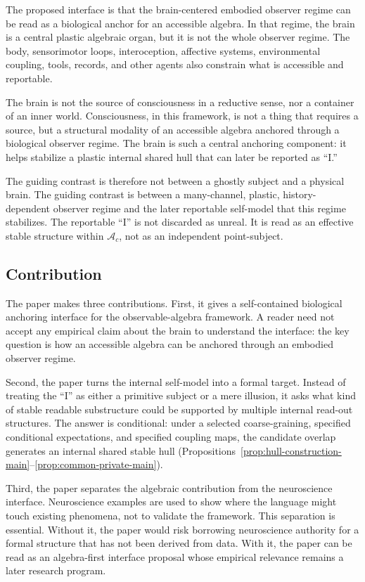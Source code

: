 \documentclass[12pt]{article}
\theoremstyle{definition}
\theoremstyle{remark}
\newcommand{\Ac}{\mathcal A_c}
\begin{document}
The proposed interface is that the brain-centered embodied observer
regime can be read as a biological anchor for an accessible algebra. In
that regime, the brain is a central plastic algebraic organ, but it is
not the whole observer regime. The body, sensorimotor loops,
interoception, affective systems, environmental coupling, tools,
records, and other agents also constrain what is accessible and
reportable.

The brain is not the source of consciousness in a reductive sense, nor
a container of an inner world. Consciousness, in this framework, is not
a thing that requires a source, but a structural modality of an
accessible algebra anchored through a biological observer regime. The
brain is such a central anchoring component: it helps stabilize a
plastic internal shared hull that can later be reported as ``I.''

The guiding contrast is therefore not between a ghostly subject and a
physical brain. The guiding contrast is between a many-channel,
plastic, history-dependent observer regime and the later reportable
self-model that this regime stabilizes. The reportable ``I'' is not
discarded as unreal. It is read as an effective stable structure within
\(\Ac\), not as an independent point-subject.

\subsection*{Contribution}

The paper makes three contributions. First, it gives a self-contained
biological anchoring interface for the observable-algebra framework. A
reader need not accept any empirical claim about the brain to understand
the interface: the key question is how an accessible algebra can be
anchored through an embodied observer regime.

Second, the paper turns the internal self-model into a formal target.
Instead of treating the ``I'' as either a primitive subject or a mere
illusion, it asks what kind of stable readable substructure could be
supported by multiple internal read-out structures. The answer is
conditional: under a selected coarse-graining, specified conditional
expectations, and specified coupling maps, the candidate overlap
generates an internal shared stable hull
(Propositions~\ref{prop:hull-construction-main}--\ref{prop:common-private-main}).

Third, the paper separates the algebraic contribution from the
neuroscience interface. Neuroscience examples are used to show where the
language might touch existing phenomena, not to validate the framework.
This separation is essential. Without it, the paper would risk borrowing
neuroscience authority for a formal structure that has not been derived
from data. With it, the paper can be read as an algebra-first interface
proposal whose empirical relevance remains a later research program.
\end{document}
